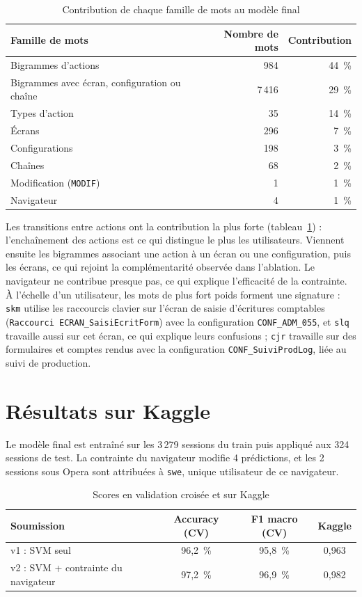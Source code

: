 \documentclass{rapportECL}
\newcommand{\tok}[1]{\texttt{\small #1}}
\begin{document}
\begin{table}[!htbp]
\centering\small
\begin{tabular}{lrr}
\toprule
Famille de mots & Nombre de mots & Contribution \\
\midrule
Bigrammes d'actions & 984 & 44~\% \\
Bigrammes avec écran, configuration ou chaîne & 7\,416 & 29~\% \\
Types d'action & 35 & 14~\% \\
Écrans & 296 & 7~\% \\
Configurations & 198 & 3~\% \\
Chaînes & 68 & 2~\% \\
Modification (\tok{MODIF}) & 1 & 1~\% \\
Navigateur & 4 & 1~\% \\
\bottomrule
\end{tabular}
\caption{Contribution de chaque famille de mots au modèle final}
\label{tab:familles}
\end{table}

Les transitions entre actions ont la contribution la plus forte (tableau~\ref{tab:familles}) : l'enchaînement des actions est ce qui distingue le plus les utilisateurs. Viennent ensuite les bigrammes associant une action à un écran ou une configuration, puis les écrans, ce qui rejoint la complémentarité observée dans l'ablation. Le navigateur ne contribue presque pas, ce qui explique l'efficacité de la contrainte. À l'échelle d'un utilisateur, les mots de plus fort poids forment une signature : \tok{skm} utilise les raccourcis clavier sur l'écran de saisie d'écritures comptables (\tok{Raccourci ECRAN\_SaisiEcritForm}) avec la configuration \tok{CONF\_ADM\_055}, et \tok{slq} travaille aussi sur cet écran, ce qui explique leurs confusions ; \tok{cjr} travaille sur des formulaires et comptes rendus avec la configuration \tok{CONF\_SuiviProdLog}, liée au suivi de production.

\section{Résultats sur Kaggle}

Le modèle final est entraîné sur les 3\,279 sessions du train puis appliqué aux 324 sessions de test. La contrainte du navigateur modifie 4 prédictions, et les 2 sessions sous Opera sont attribuées à \tok{swe}, unique utilisateur de ce navigateur.

\begin{table}[!htbp]
\centering\small
\begin{tabular}{lccc}
\toprule
Soumission & Accuracy (CV) & F1 macro (CV) & Kaggle \\
\midrule
v1 : SVM seul & 96,2~\% & 95,8~\% & 0,963 \\
v2 : SVM + contrainte du navigateur & 97,2~\% & 96,9~\% & 0,982 \\
\bottomrule
\end{tabular}
\caption{Scores en validation croisée et sur Kaggle}
\label{tab:kaggle}
\end{table}
\end{document}
